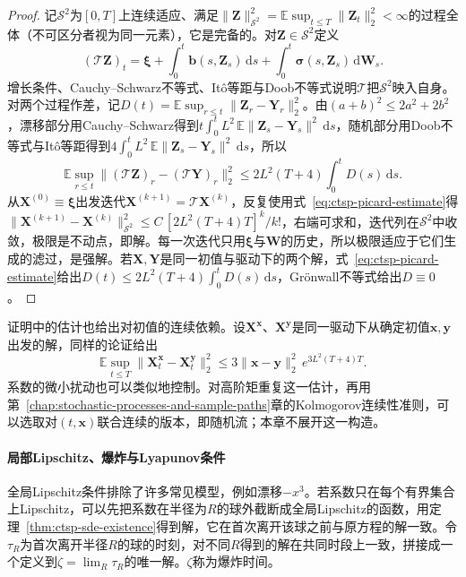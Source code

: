 \begin{proof}
记$\mathcal S^2$为$[0,T]$上连续适应、满足$\|\bm Z\|^2_{\mathcal S^2}=\mathbb E\sup_{t\leq T}\|\bm Z_t\|_2^2<\infty$的过程全体（不可区分者视为同一元素），它是完备的。对$\bm Z\in\mathcal S^2$定义
\[
  (\mathcal T\bm Z)_t=\bm\xi+\int_0^t\bm b(s,\bm Z_s)\,\mathrm ds+\int_0^t\bm\sigma(s,\bm Z_s)\,\mathrm d\bm W_s .
\]
增长条件、Cauchy--Schwarz不等式、Itô等距与Doob不等式说明$\mathcal T$把$\mathcal S^2$映入自身。对两个过程作差，记$D(t)=\mathbb E\sup_{r\leq t}\|\bm Z_r-\bm Y_r\|_2^2$。由$(a+b)^2\leq2a^2+2b^2$，漂移部分用Cauchy--Schwarz得到$t\int_0^tL^2\,\mathbb E\|\bm Z_s-\bm Y_s\|^2\,\mathrm ds$，随机部分用Doob不等式与Itô等距得到$4\int_0^tL^2\,\mathbb E\|\bm Z_s-\bm Y_s\|^2\,\mathrm ds$，所以
\begin{equation}
  \mathbb E\sup_{r\leq t}\|(\mathcal T\bm Z)_r-(\mathcal T\bm Y)_r\|_2^2\leq2L^2(T+4)\int_0^tD(s)\,\mathrm ds .
  \label{eq:ctsp-picard-estimate}
\end{equation}
从$\bm X^{(0)}\equiv\bm\xi$出发迭代$\bm X^{(k+1)}=\mathcal T\bm X^{(k)}$，反复使用式~\eqref{eq:ctsp-picard-estimate}得$\|\bm X^{(k+1)}-\bm X^{(k)}\|^2_{\mathcal S^2}\leq C\,[2L^2(T+4)T]^k/k!$，右端可求和，迭代列在$\mathcal S^2$中收敛，极限是不动点，即解。每一次迭代只用$\bm\xi$与$\bm W$的历史，所以极限适应于它们生成的滤过，是强解。若$\bm X,\bm Y$是同一初值与驱动下的两个解，式~\eqref{eq:ctsp-picard-estimate}给出$D(t)\leq2L^2(T+4)\int_0^tD(s)\,\mathrm ds$，Grönwall不等式给出$D\equiv0$。
\end{proof}

证明中的估计也给出对初值的连续依赖。设$\bm X^{\bm x}$、$\bm X^{\bm y}$是同一驱动下从确定初值$\bm x,\bm y$出发的解，同样的论证给出
\[
  \mathbb E\sup_{t\leq T}\|\bm X^{\bm x}_t-\bm X^{\bm y}_t\|_2^2\leq3\|\bm x-\bm y\|_2^2\,e^{3L^2(T+4)T}.
\]
系数的微小扰动也可以类似地控制。对高阶矩重复这一估计，再用第~\ref{chap:stochastic-processes-and-sample-paths}章的Kolmogorov连续性准则，可以选取对$(t,\bm x)$联合连续的版本，即随机流；本章不展开这一构造。

\paragraph{局部Lipschitz、爆炸与Lyapunov条件}
全局Lipschitz条件排除了许多常见模型，例如漂移$-x^3$。若系数只在每个有界集合上Lipschitz，可以先把系数在半径为$R$的球外截断成全局Lipschitz的函数，用定理~\ref{thm:ctsp-sde-existence}得到解，它在首次离开该球之前与原方程的解一致。令$\tau_R$为首次离开半径$R$的球的时刻，对不同$R$得到的解在共同时段上一致，拼接成一个定义到$\zeta=\lim_R\tau_R$的唯一解。$\zeta$称为爆炸时间。

